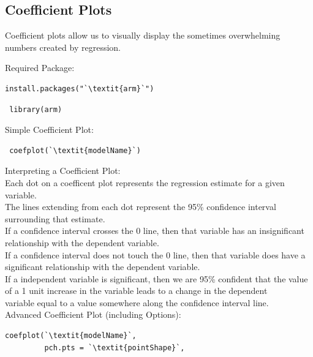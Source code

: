 \documentclass[12pt,letterpaper]{article}
\newcommand{\ind}{\phantom{AA}}
\begin{document}
\subsection{Coefficient Plots}
Coefficient plots allow us to visually display the sometimes overwhelming numbers created by regression.
\begin{tcolorbox}[title = Coefficient Plots]
Required Package:
\begin{lstlisting}[frameround = t t t t, backgroundcolor = \color{lightgray}]
  install.packages("`\textit{arm}`")
\end{lstlisting}
\begin{lstlisting}
 library(arm)
\end{lstlisting}
\end{tcolorbox}
\begin{tcolorbox}[title = Coefficient Plots (cont.)]
Simple Coefficient Plot:
\begin{lstlisting}
 coefplot(`\textit{modelName}`)
\end{lstlisting}
Interpreting a Coefficient Plot:\\
\ind Each dot on a coefficent plot represents the regression estimate for a given\\ \ind \ind variable. \\
\ind The lines extending from each dot represent the 95\% confidence interval\\ \ind \ind  surrounding that estimate.\\
\ind If a confidence interval crosses the 0 line, then that variable has an insignificant\\ \ind \ind  relationship with the dependent variable.\\
\ind If a confidence interval does not touch the 0 line, then that variable does have a \\ \ind \ind significant relationship with the dependent variable. \\
\ind If a independent variable is significant, then we are 95\% confident that the value \\ \ind \ind of a 1 unit increase in the variable leads to a change in the dependent\\ \ind \ind  variable equal to a value somewhere along the confidence interval line. 
\vspace{1em}\\
Advanced Coefficient Plot (including Options):
\begin{lstlisting}
coefplot(`\textit{modelName}`, 
         pch.pts = `\textit{pointShape}`, 

\end{lstlisting}
\end{tcolorbox}
\end{document}
